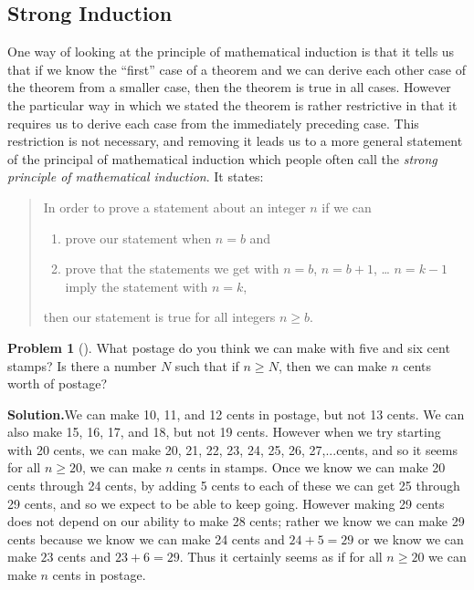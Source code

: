 \documentclass[10pt,]{book}
\theoremstyle{plain}
\theoremstyle{definition}
\newtheorem{activity}[project]{Problem}
\theoremstyle{definition}
\numberwithin{equation}{chapter}
\begin{document}
\subsection[{Strong Induction}]{Strong Induction}\label{subsection-68}
One way of looking at the principle of mathematical induction is that it tells us that if we know the ``first'' case of a theorem and we can derive each other case of the theorem from a smaller case, then the theorem is true in all cases. However the particular way in which we stated the theorem is rather restrictive in that it requires us to derive each case from the immediately preceding case. This restriction is not necessary, and removing it leads us to a more general statement of the principal of mathematical induction which people often call the \emph{strong principle of mathematical induction}. It states:%
\begin{quote}\hypertarget{blockquote-19}{}
In order to prove a statement about an integer \(n\) if we can \leavevmode%
\begin{enumerate}
\item\hypertarget{li-135}{}prove our statement when \(n=b\) and%
\item\hypertarget{li-136}{}prove that the statements we get with \(n=b\), \(n=b+1\), \dots{} \(n=k-1\) imply the statement with \(n=k\),%
\end{enumerate}
 then our statement is true for all integers \(n\ge b\).%
\end{quote}
\begin{activity}[]\label{activity-367}
What postage do you think we can make with five and six cent stamps? Is there a number \(N\) such that if \(n\ge N\), then we can make \(n\) cents worth of postage?%
\par\medskip\noindent%
\textbf{Solution.}\quad We can make 10, 11, and 12 cents in postage, but not 13 cents. We can also make 15, 16, 17, and 18, but not 19 cents. However when we try starting with 20 cents, we can make 20, 21, 22, 23, 24, 25, 26, 27,...cents, and so it seems for all \(n\ge 20\), we can make \(n\) cents in stamps. Once we know we can make 20 cents through 24 cents, by adding 5 cents to each of these we can get 25 through 29 cents, and so we expect to be able to keep going. However making 29 cents does not depend on our ability to make 28 cents; rather we know we can make 29 cents because we know we can make 24 cents and \(24+5=29\) or we know we can make \(23\) cents and \(23+6=29\). Thus it certainly seems as if for all \(n\ge 20\) we can make \(n\) cents in postage.%
\end{activity}
\end{document}
